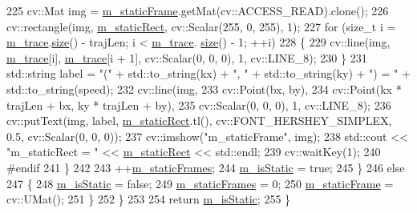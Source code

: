 \begin{DoxyCode}
225                 cv::Mat img = \mbox{\hyperlink{class_c_track_a87bfcad44f8da34b2411733ed5ddcbae}{m\_staticFrame}}.getMat(cv::ACCESS\_READ).clone();
226                 cv::rectangle(img, \mbox{\hyperlink{class_c_track_abbec66a84ee65ce5d6390565698e5156}{m\_staticRect}}, cv::Scalar(255, 0, 255), 1);
227                 \textcolor{keywordflow}{for} (\textcolor{keywordtype}{size\_t} i = \mbox{\hyperlink{class_c_track_adf88ff8678ec928ac3ca764f7308b96f}{m\_trace}}.\mbox{\hyperlink{class_trace_a1bc7111ffb39ba415c2553677fc2f3ba}{size}}() - trajLen; i < \mbox{\hyperlink{class_c_track_adf88ff8678ec928ac3ca764f7308b96f}{m\_trace}}.
      \mbox{\hyperlink{class_trace_a1bc7111ffb39ba415c2553677fc2f3ba}{size}}() - 1; ++i)
228                 \{
229                     cv::line(img, \mbox{\hyperlink{class_c_track_adf88ff8678ec928ac3ca764f7308b96f}{m\_trace}}[i], \mbox{\hyperlink{class_c_track_adf88ff8678ec928ac3ca764f7308b96f}{m\_trace}}[i + 1], cv::Scalar(0, 0, 0), 1, 
      cv::LINE\_8);
230                 \}
231                 std::string label = \textcolor{stringliteral}{"("} + std::to\_string(kx) + \textcolor{stringliteral}{", "}  + std::to\_string(ky) + \textcolor{stringliteral}{") = "} + 
      std::to\_string(speed);
232                 cv::line(img,
233                          cv::Point(bx, by),
234                          cv::Point(kx * trajLen + bx, ky * trajLen + by),
235                          cv::Scalar(0, 0, 0), 1, cv::LINE\_8);
236                 cv::putText(img, label, \mbox{\hyperlink{class_c_track_abbec66a84ee65ce5d6390565698e5156}{m\_staticRect}}.tl(), cv::FONT\_HERSHEY\_SIMPLEX, 0.5, 
      cv::Scalar(0, 0, 0));
237                 cv::imshow(\textcolor{stringliteral}{"m\_staticFrame"}, img);
238                 std::cout << \textcolor{stringliteral}{"m\_staticRect = "} << \mbox{\hyperlink{class_c_track_abbec66a84ee65ce5d6390565698e5156}{m\_staticRect}} << std::endl;
239                 cv::waitKey(1);
240 \textcolor{preprocessor}{#endif}
241             \}
242 
243             ++\mbox{\hyperlink{class_c_track_abafeef3579e8b8ee12dd6e8c788c368e}{m\_staticFrames}};
244             \mbox{\hyperlink{class_c_track_a37f858466a4c5de19eea18ab829e4745}{m\_isStatic}} = \textcolor{keyword}{true};
245         \}
246         \textcolor{keywordflow}{else}
247         \{
248             \mbox{\hyperlink{class_c_track_a37f858466a4c5de19eea18ab829e4745}{m\_isStatic}} = \textcolor{keyword}{false};
249             \mbox{\hyperlink{class_c_track_abafeef3579e8b8ee12dd6e8c788c368e}{m\_staticFrames}} = 0;
250             \mbox{\hyperlink{class_c_track_a87bfcad44f8da34b2411733ed5ddcbae}{m\_staticFrame}} = cv::UMat();
251         \}
252     \}
253 
254     \textcolor{keywordflow}{return} \mbox{\hyperlink{class_c_track_a37f858466a4c5de19eea18ab829e4745}{m\_isStatic}};
255 \}
\end{DoxyCode}
